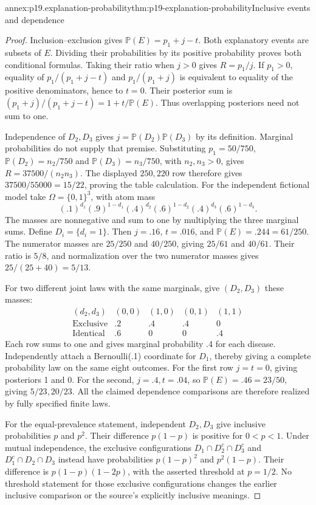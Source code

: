 \begin{annexitem}{annex:p19.explanation-probability}{thm:p19-explanation-probability}{Inclusive events and dependence}
\begin{proof}
Inclusion--exclusion gives
\(\mathbb P(E)=p_1+j-t\). Both explanatory events are
subsets of \(E\). Dividing their probabilities by its
positive probability proves both conditional formulas.
Taking their ratio when \(j>0\) gives \(R=p_1/j\).
If \(p_1>0\), equality of
\(p_1/(p_1+j-t)\) and \(p_1/(p_1+j)\) is equivalent to
equality of the positive denominators, hence to \(t=0\).
Their posterior sum is
\((p_1+j)/(p_1+j-t)=1+t/\mathbb P(E)\).
Thus overlapping posteriors need not sum to one.

Independence of \(D_2,D_3\) gives
\(j=\mathbb P(D_2)\mathbb P(D_3)\) by its definition.
Marginal probabilities do not supply that premise.
Substituting \(p_1=50/750\), \(\mathbb P(D_2)=n_2/750\)
and \(\mathbb P(D_3)=n_3/750\), with \(n_2,n_3>0\),
gives \(R=37500/(n_2n_3)\).
The displayed \(250,220\) row therefore gives
\(37500/55000=15/22\), proving the table calculation.
For the independent fictional model take
\(\Omega=\{0,1\}^3\), with atom mass
\[
 (.1)^{d_1}(.9)^{1-d_1}
 (.4)^{d_2}(.6)^{1-d_2}
 (.4)^{d_3}(.6)^{1-d_3}.
\]
The masses are nonnegative and sum to one by multiplying
the three marginal sums. Define \(D_i=\{d_i=1\}\).
Then \(j=.16\), \(t=.016\), and
\(\mathbb P(E)=.244=61/250\).
The numerator masses are \(25/250\) and \(40/250\),
giving \(25/61\) and \(40/61\).
Their ratio is \(5/8\), and normalization over the two
numerator masses gives \(25/(25+40)=5/13\).

For two different joint laws with the same marginals,
give \((D_2,D_3)\) these masses:
\[
\begin{array}{c|rrrr}
(d_2,d_3)&(0,0)&(1,0)&(0,1)&(1,1)\\\hline
\text{Exclusive}&.2&.4&.4&0\\
\text{Identical}&.6&0&0&.4
\end{array}
\]
Each row sums to one and gives marginal probability .4
for each disease. Independently attach a Bernoulli(.1)
coordinate for \(D_1\), thereby giving a complete
probability law on the same eight outcomes.
For the first row \(j=t=0\), giving posteriors 1 and 0.
For the second, \(j=.4,t=.04\), so
\(\mathbb P(E)=.46=23/50\), giving \(5/23,20/23\).
All the claimed dependence comparisons are therefore
realized by fully specified finite laws.

For the equal-prevalence statement, independent \(D_2,D_3\)
give inclusive probabilities \(p\) and \(p^2\).
Their difference \(p(1-p)\) is positive for \(0<p<1\).
Under mutual independence, the exclusive configurations
\(D_1\cap D_2^c\cap D_3^c\) and
\(D_1^c\cap D_2\cap D_3\) instead have probabilities
\(p(1-p)^2\) and \(p^2(1-p)\).
Their difference is \(p(1-p)(1-2p)\), with the asserted
threshold at \(p=1/2\). No threshold statement for those
exclusive configurations changes the earlier inclusive
comparison or the source's explicitly inclusive meanings.
\end{proof}
\end{annexitem}

